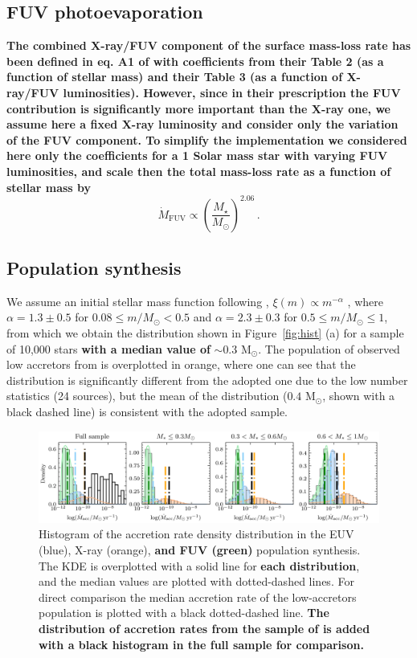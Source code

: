 \documentclass[fleqn,usenatbib]{mnras}
\begin{document}
\subsection{FUV photoevaporation}

\textbf{The combined X-ray/FUV component of the surface mass-loss rate has been defined in eq. A1 of \cite{Komaki2021} with coefficients from their Table 2 (as a function of stellar mass) and their Table 3 (as a function of X-ray/FUV luminosities). However, since in their prescription the FUV contribution is significantly more important than the X-ray one, we assume here a fixed X-ray luminosity and consider only the variation of the FUV component. To simplify the implementation we considered here only the coefficients for a 1 Solar mass star with varying FUV luminosities, and scale then the total mass-loss rate as a function of stellar mass by \citep{Komaki2021}
\begin{equation}
    \dot{M}_\mathrm{FUV} \propto \left(\frac{M_\star}{M_\odot}\right)^{2.06} \,.
\end{equation}}

\subsection{Population synthesis}
We assume an initial stellar mass function following \citet{Kroupa2001}, 
    $\xi(m) \propto m^{-\alpha}$ ,
where $\alpha = 1.3 \pm 0.5$ for $0.08 \leq m/M_\odot < 0.5$ and $\alpha = 2.3 \pm 0.3$ for $0.5 \leq m/M_\odot \leq 1$, from which we obtain the distribution shown in Figure~\ref{fig:hist} (a) for a sample of 10,000 stars \textbf{with a median value of} $\sim 0.3$ M$_\odot$.
The population of observed low accretors from  is overplotted in orange, where one can see that the distribution is significantly different from the adopted one due to the low number statistics (24 sources), but the mean of the distribution ($0.4$ M$_\odot$, shown with a black dashed line) is consistent with the adopted sample.

\begin{figure}
    \includegraphics{Fig7}
    \caption{Histogram of the accretion rate density distribution in the EUV (blue), X-ray (orange), \textbf{and FUV (green)} population synthesis. The KDE is overplotted with a solid line for \textbf{each distribution}, and the median values are plotted with dotted-dashed lines. For direct comparison the median accretion rate of the low-accretors population is plotted with a black dotted-dashed line. \textbf{The distribution of accretion rates from the sample of \citet{Manara2023} is added with a black histogram in the full sample for comparison.}\label{fig:hist_mdot}}
\end{figure}
\end{document}
